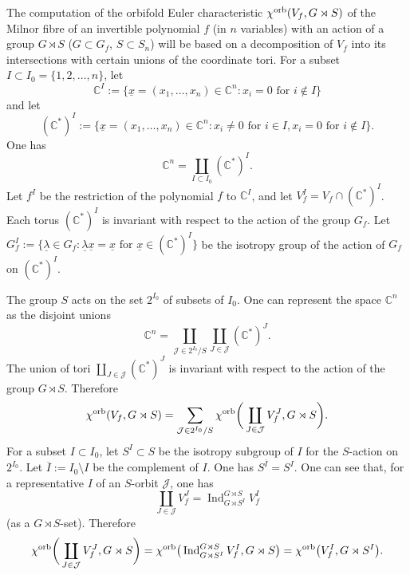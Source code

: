 The computation of the orbifold Euler characteristic ${\chi}^{\rm orb}(V_f, G \rtimes S)$ of the Milnor fibre of an invertible polynomial $f$ (in $n$ variables) with an action of a group $G\rtimes S$ ($G\subset G_f$, $S\subset S_n$) will be based on a decomposition of $V_f$ into its intersections with certain unions of the coordinate tori. For a subset $I\subset I_0=\{1, 2, \dots, n\}$, let
\[
{\mathbb C}^I:=\big\{\underline{x}=(x_1, \dots, x_n)\in {\mathbb C}^n\colon x_i=0 \text{ for }i\notin I\big\}
\]
and let
\[
({\mathbb C}^*)^I:=\big\{\underline{x}=(x_1, \dots, x_n)\in {\mathbb C}^n\colon x_i\neq 0 \text{ for }i\in I, x_i=0 \text{ for }i\notin I\big\} .
\]
One has
\[
{\mathbb C}^n=\coprod_{I\subset I_0} ({\mathbb C}^*)^I.
\]
Let $f^I$ be the restriction of the polynomial $f$ to ${\mathbb C}^I$, and let $V_f^I=V_f \cap ({\mathbb C}^*)^I$.
Each torus $({\mathbb C}^\ast)^I$ is invariant with respect to the action of the group $G_f$.
Let $G_f^I:=\big\{ \underline{\lambda} \in G_f \colon \underline{\lambda} \underline{x} =
\underline{x} \mbox{ for } \underline{x} \in ({\mathbb C}^\ast)^I \big\}$ be the isotropy group of the action of $G_f$ on $({\mathbb C}^\ast)^I$.

The group $S$ acts on the set $2^{I_0}$ of subsets of $I_0$. One can represent the space ${\mathbb C}^n$ as the disjoint unions
\[
{\mathbb C}^n=\coprod_{{\mathcal J}\in 2^{I_0}/S}\coprod_{J\in{\mathcal J}}({\mathbb C}^*)^J.
\]
The union of tori $\coprod_{J\in{\mathcal J}}({\mathbb C}^*)^J$ is invariant with respect to the action of the group $G \rtimes S$. Therefore
\[
{\chi}^{\rm orb}(V_f, G \rtimes S)=\sum_{{\mathcal J}\in 2^{I_0}/S}{\chi}^{\rm orb}\bigg(\coprod_{J\in{\mathcal J}}V_f^J, G \rtimes S\bigg) .
\]
For a subset $I\subset I_0$, let $S^I\subset S$ be the isotropy subgroup of $I$ for the $S$-action on $2^{I_0}$. Let $\overline{I} := I_0 \setminus I$ be the complement of $I$. One has $S^{\overline{I}}=S^I$.
One can see that, for a representative $I$ of an $S$-orbit ${\mathcal J}$, one has
\[
\coprod_{J\in{\mathcal J}}V_f^J=\operatorname{Ind}_{G\rtimes S^I}^{G\rtimes S} V_f^I
\]
(as a $G\rtimes S$-set). Therefore
\[
{\chi}^{\rm orb}\bigg(\coprod_{J\in{\mathcal J}}V_f^J,G \rtimes S\bigg)=
{\chi}^{\rm orb}\big(\operatorname{Ind}_{G\rtimes S^I}^{G\rtimes S} V_f^I, G\rtimes S\big)=
{\chi}^{\rm orb}\big(V_f^I, G\rtimes S^I\big).
\]

